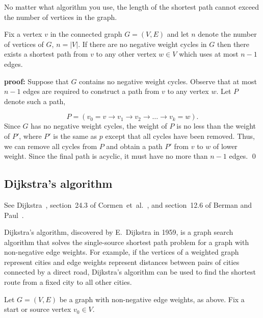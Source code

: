 No matter what algorithm you use, the length of the shortest path
cannot exceed the number of vertices in the graph.

\begin{lemma}
\label{lemma:shortest-path}
{\rm
Fix a vertex $v$ in the connected graph $G=(V,E)$ and let $n$ denote the
number of vertices of $G$, $n=|V|$.
If there are no negative weight cycles in $G$ then there
exists a shortest path from $v$
to any other vertex $w\in V$ which uses at most $n-1$ edges.
}
\end{lemma}

{\bf proof:}
Suppose that $G$ contains no negative weight cycles.
Observe that at most $n-1$ edges are required to construct a
path from $v$ to any vertex $w$. Let $P$ denote such a path,

\[
P = (v_0=v\to v_1 \to v_2 \to \dots \to v_k = w).
\]
Since $G$ has no negative weight cycles, the weight of $P$ is no less
than the weight of $P'$, where
$P'$ is the same as $p$ except that all cycles have been removed.
Thus, we can remove all cycles from $P$ and obtain a path $P'$
from $v$ to $w$ of lower weight. Since the
final path is acyclic, it must have no more than $n-1$ edges.
\qed

\subsection{Dijkstra's algorithm}

See Dijkstra~\cite{Dijkstra1959}, section~24.3 of
Cormen~et~al.~\cite{CormenEtAl2001}, and section~12.6 of Berman and
Paul~\cite{BermanPaul1997}.

Dijkstra's algorithm, discovered by E.~Dijkstra in 1959, is a graph
search algorithm that solves the single-source shortest path problem
for a graph with non-negative edge weights. For example, if the
vertices of a weighted graph represent cities and edge weights
represent distances between pairs of cities connected by a direct
road, Dijkstra's algorithm can be used to find the shortest route from
a fixed city to all other cities.


Let $G = (V,E)$ be a graph with non-negative edge weights, as above.
Fix a start or source vertex $v_0 \in V$.

